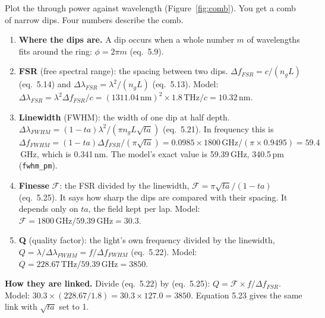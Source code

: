 \documentclass[11pt,letterpaper]{article}
\newcommand{\eq}[1]{(eq.~#1)}
\begin{document}
Plot the through power against wavelength (Figure~\ref{fig:comb}). You get a comb of narrow dips. Four numbers
describe the comb.
\begin{enumerate}
  \item \textbf{Where the dips are.} A dip occurs when a whole number $m$ of wavelengths fits around the ring:
  $\phi=2\pi m$ \eq{5.9}.
  \item \textbf{FSR} (free spectral range): the spacing between two dips. $\Delta f_{FSR}=c/(n_gL)$ \eq{5.14} and
  $\Delta\lambda_{FSR}=\lambda^2/(n_gL)$ \eq{5.13}. Model: $\Delta\lambda_{FSR}=\lambda^2\Delta f_{FSR}/c
  =(1311.04\,\mathrm{nm})^2\times1.8\,\mathrm{THz}/c=10.32$\,nm.
  \item \textbf{Linewidth} (FWHM): the width of one dip at half depth.
  $\Delta\lambda_{FWHM}=(1-ta)\lambda^2/(\pi n_gL\sqrt{ta})$ \eq{5.21}. In frequency this is
  $\Delta f_{FWHM}=(1-ta)\Delta f_{FSR}/(\pi\sqrt{ta})=0.0985\times1800\,\mathrm{GHz}/(\pi\times0.9495)=59.4$\,GHz,
  which is 0.341\,nm. The model's exact value is 59.39\,GHz, 340.5\,pm (\texttt{fwhm\_pm}).
  \item \textbf{Finesse} $\mathcal{F}$: the FSR divided by the linewidth, $\mathcal{F}=\pi\sqrt{ta}/(1-ta)$ \eq{5.25}.
  It says how sharp the dips are compared with their spacing. It depends only on $ta$, the field kept per lap.
  Model: $\mathcal{F}=1800\,\mathrm{GHz}/59.39\,\mathrm{GHz}=30.3$.
  \item \textbf{Q} (quality factor): the light's own frequency divided by the linewidth,
  $Q=\lambda/\Delta\lambda_{FWHM}=f/\Delta f_{FWHM}$ \eq{5.22}. Model: $Q=228.67\,\mathrm{THz}/59.39\,\mathrm{GHz}=3850$.
\end{enumerate}
\textbf{How they are linked.} Divide \eq{5.22} by \eq{5.25}: $Q=\mathcal{F}\times f/\Delta f_{FSR}$. Model:
$30.3\times(228.67/1.8)=30.3\times127.0=3850$. Equation 5.23 gives the same link with $\sqrt{ta}$ set to 1.
\end{document}
